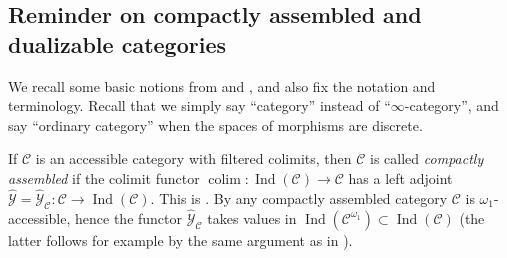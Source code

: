 \documentclass[11pt,leqno]{amsart}
\numberwithin{equation}{section}
\def\bR{{\mathbf R}}
\def\Hom{\operatorname{Hom}}
\DeclareMathOperator*{\colim}{colim}
\newcommand{\hto}{\hookrightarrow}
\newcommand{\Cone}{\operatorname{Cone}}
\newcommand{\cont}{\operatorname{cont}}
\newcommand{\St}{\operatorname{St}}
\newcommand{\cC}{{\mathcal C}}
\newcommand{\cE}{{\mathcal E}}
\newcommand{\cY}{{\mathcal Y}}
\newcommand{\Fun}{\operatorname{Fun}}
\newcommand{\coker}{\operatorname{coker}}
\newcommand{\add}{\operatorname{add}}
\newcommand{\Ind}{\operatorname{Ind}}
\newcommand{\m}{\mathfrak{m}}
\begin{document}

\subsection{Reminder on compactly assembled and dualizable categories}
\label{ssec:reminder_on_compass}

We recall some basic notions from \cite{Lur18} and \cite{E24}, and also fix the notation and terminology. Recall that we simply say ``category'' instead of ``$\infty$-category'', and say ``ordinary category'' when the spaces of morphisms are discrete.

If $\cC$ is an accessible category with filtered colimits, then $\cC$ is called {\it compactly assembled} if the colimit functor $\colim:\Ind(\cC)\to\cC$ has a left adjoint $\hat{\cY}=\hat{\cY}_{\cC}:\cC\to\Ind(\cC).$ This is \cite[Definition 21.1.2.1]{Lur18}. By \cite[Proposition 1.24]{E24} any compactly assembled category $\cC$ is $\omega_1$-accessible, hence the functor $\hat{\cY}_{\cC}$ takes values in $\Ind(\cC^{\omega_1})\subset\Ind(\cC)$ (the latter follows for example by the same argument as in \cite[Corollary 1.22]{E24}).
\end{document}
